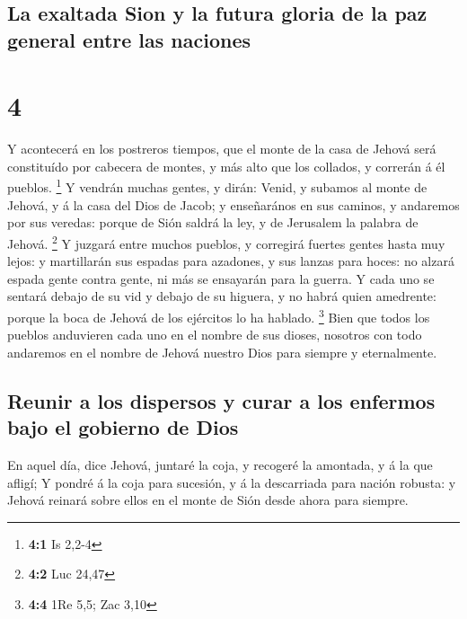 \hypertarget{la-exaltada-sion-y-la-futura-gloria-de-la-paz-general-entre-las-naciones}{%
\subsection{La exaltada Sion y la futura gloria de la paz general entre
las
naciones}\label{la-exaltada-sion-y-la-futura-gloria-de-la-paz-general-entre-las-naciones}}

\hypertarget{section-3}{%
\section{4}\label{section-3}}

 Y acontecerá en los postreros tiempos, que el monte de la
casa de Jehová será constituído por cabecera de montes, y más alto que
los collados, y correrán á él pueblos. \footnote{\textbf{4:1} Is 2,2-4}
 Y vendrán muchas gentes, y dirán: Venid, y subamos al monte
de Jehová, y á la casa del Dios de Jacob; y enseñarános en sus caminos,
y andaremos por sus veredas: porque de Sión saldrá la ley, y de
Jerusalem la palabra de Jehová. \footnote{\textbf{4:2} Luc 24,47}
 Y juzgará entre muchos pueblos, y corregirá fuertes gentes
hasta muy lejos: y martillarán sus espadas para azadones, y sus lanzas
para hoces: no alzará espada gente contra gente, ni más se ensayarán
para la guerra.  Y cada uno se sentará debajo de su vid y
debajo de su higuera, y no habrá quien amedrente: porque la boca de
Jehová de los ejércitos lo ha hablado. \footnote{\textbf{4:4} 1Re 5,5;
  Zac 3,10}  Bien que todos los pueblos anduvieren cada uno
en el nombre de sus dioses, nosotros con todo andaremos en el nombre de
Jehová nuestro Dios para siempre y eternalmente.

\hypertarget{reunir-a-los-dispersos-y-curar-a-los-enfermos-bajo-el-gobierno-de-dios}{%
\subsection{Reunir a los dispersos y curar a los enfermos bajo el
gobierno de
Dios}\label{reunir-a-los-dispersos-y-curar-a-los-enfermos-bajo-el-gobierno-de-dios}}

 En aquel día, dice Jehová, juntaré la coja, y recogeré la
amontada, y á la que afligí;  Y pondré á la coja para
sucesión, y á la descarriada para nación robusta: y Jehová reinará sobre
ellos en el monte de Sión desde ahora para siempre.

